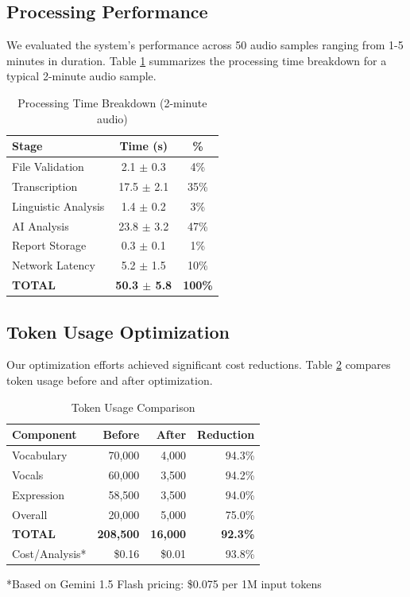 \documentclass[conference]{IEEEtran}
\begin{document}
\subsection{Processing Performance}

We evaluated the system's performance across 50 audio samples ranging from 1-5 minutes in duration. Table \ref{tab:performance} summarizes the processing time breakdown for a typical 2-minute audio sample.

\begin{table}[htbp]
\caption{Processing Time Breakdown (2-minute audio)}
\begin{center}
\begin{tabular}{|l|c|c|}
\hline
\textbf{Stage} & \textbf{Time (s)} & \textbf{\%} \\
\hline
File Validation & 2.1 $\pm$ 0.3 & 4\% \\
Transcription & 17.5 $\pm$ 2.1 & 35\% \\
Linguistic Analysis & 1.4 $\pm$ 0.2 & 3\% \\
AI Analysis & 23.8 $\pm$ 3.2 & 47\% \\
Report Storage & 0.3 $\pm$ 0.1 & 1\% \\
Network Latency & 5.2 $\pm$ 1.5 & 10\% \\
\hline
\textbf{TOTAL} & \textbf{50.3 $\pm$ 5.8} & \textbf{100\%} \\
\hline
\end{tabular}
\label{tab:performance}
\end{center}
\end{table}

\subsection{Token Usage Optimization}

Our optimization efforts achieved significant cost reductions. Table \ref{tab:tokens} compares token usage before and after optimization.

\begin{table}[htbp]
\caption{Token Usage Comparison}
\begin{center}
\begin{tabular}{|l|r|r|r|}
\hline
\textbf{Component} & \textbf{Before} & \textbf{After} & \textbf{Reduction} \\
\hline
Vocabulary & 70,000 & 4,000 & 94.3\% \\
Vocals & 60,000 & 3,500 & 94.2\% \\
Expression & 58,500 & 3,500 & 94.0\% \\
Overall & 20,000 & 5,000 & 75.0\% \\
\hline
\textbf{TOTAL} & \textbf{208,500} & \textbf{16,000} & \textbf{92.3\%} \\
\hline
Cost/Analysis* & \$0.16 & \$0.01 & 93.8\% \\
\hline
\end{tabular}
\label{tab:tokens}
\end{center}
\footnotesize{*Based on Gemini 1.5 Flash pricing: \$0.075 per 1M input tokens}
\end{table}
\end{document}
